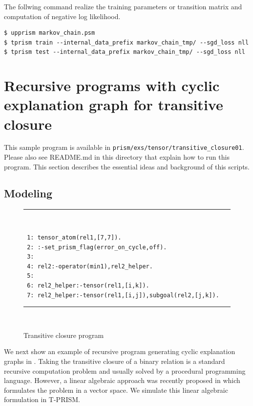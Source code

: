 \documentclass[a4paper]{report}
\begin{document}
The follwing command realize the training parameters or transition matrix and computation of negative log likelihood.
\begin{verbatim}
$ upprism markov_chain.psm
$ tprism train --internal_data_prefix markov_chain_tmp/ --sgd_loss nll
$ tprism test --internal_data_prefix markov_chain_tmp/ --sgd_loss nll
\end{verbatim}

\section{Recursive programs with cyclic explanation graph for transitive closure}
\label{sec:transitive_closure01}

This sample program is available in \verb|prism/exs/tensor/transitive_closure01|.
Please also see README.md in this directory that explain how to run  this program.
This section describes the essential ideas and background of this scripts. 


\subsection*{Modeling}

\begin{figure}[tb]
	\rule{0.85\textwidth}{0.10mm}\\ [-1em]
	\begin{verbatim}
 1: tensor_atom(rel1,[7,7]).
 2: :-set_prism_flag(error_on_cycle,off).
 3:
 4: rel2:-operator(min1),rel2_helper.
 5: 
 6: rel2_helper:-tensor(rel1,[i,k]).
 7: rel2_helper:-tensor(rel1,[i,j]),subgoal(rel2,[j,k]).
	\end{verbatim}
	\rule{0.85\textwidth}{0.10mm}\\ [-1em]
	\caption{Transitive closure program}
	\label{fig:tc}
\end{figure}

We  next  show  an  example of  recursive  program  generating  cyclic
explanation  graphs  in  .   Taking  the  transitive
closure  of a  binary  relation is  a  standard recursive  computation
problem  and  usually solved  by  a  procedural programming  language.
However,   a   linear   algebraic  approach   was   recently   proposed
in  \cite{sato2017linear} which  formulates  the problem  in a  vector
space.  We simulate this linear algebraic formulation in T-PRISM.
\end{document}
